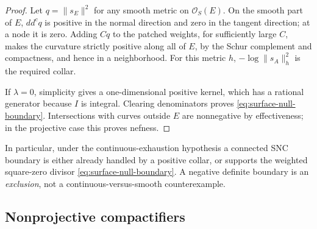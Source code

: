\documentclass[11pt]{amsart}
\theoremstyle{definition}
\theoremstyle{remark}
\numberwithin{equation}{section}
\newcommand{\OO}{\mathcal O}
\newcommand{\ddc}{dd^c}
\begin{document}
\begin{proof}
Let $q=\|s_E\|^2$ for any smooth metric on $\OO_S(E)$. On the smooth
part of $E$, $\ddc q$ is positive in the normal direction and zero
in the tangent direction; at a node it is zero. Adding $Cq$ to the
patched weights, for sufficiently large $C$, makes the curvature
strictly positive along all of $E$, by the Schur complement and
compactness, and hence in a neighborhood. For this metric $h$,
$-\log\|s_A\|_h^2$ is the required collar.

If $\lambda=0$, simplicity gives a one-dimensional positive kernel,
which has a rational generator because $I$ is integral. Clearing
denominators proves \eqref{eq:surface-null-boundary}. Intersections
with curves outside $E$ are nonnegative by effectiveness; in the
projective case this proves nefness.
\end{proof}

In particular, under the continuous-exhaustion hypothesis a connected
SNC boundary is either already handled by a positive collar, or
supports the weighted square-zero divisor
\eqref{eq:surface-null-boundary}. A negative definite boundary is an
\emph{exclusion}, not a continuous-versus-smooth counterexample.

\subsection{Nonprojective compactifiers}\label{sec:surface-nonprojective}
\end{document}
